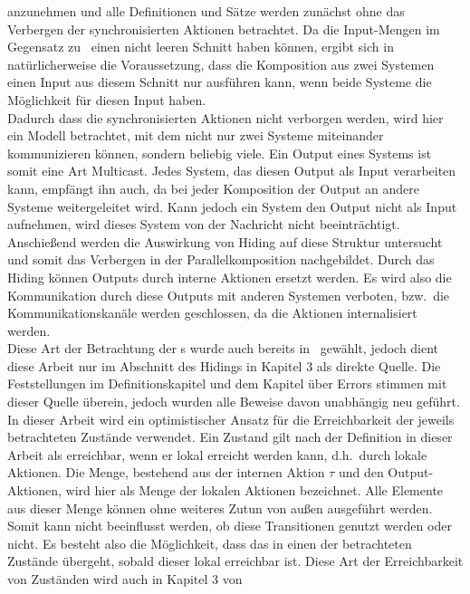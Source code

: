 anzunehmen und alle Definitionen und Sätze werden zunächst ohne das
Verbergen der synchronisierten Aktionen betrachtet. Da die Input-Mengen im
Gegensatz zu~\cite{Vogler2014EIO} einen
nicht leeren Schnitt haben können, ergibt sich in natürlicherweise die
Voraussetzung, dass die Komposition
aus zwei Systemen einen Input aus diesem Schnitt nur ausführen kann, wenn beide
Systeme die Möglichkeit für diesen Input haben.\\
Dadurch dass die synchronisierten Aktionen nicht verborgen werden, wird hier
ein Modell betrachtet, mit dem nicht nur zwei Systeme miteinander kommunizieren können,
sondern beliebig viele. Ein Output eines Systems ist somit eine Art Multicast.
Jedes System, das diesen Output als Input verarbeiten kann, empfängt ihn auch,
da bei jeder Komposition der Output an andere Systeme weitergeleitet wird.
Kann jedoch ein System den Output nicht als Input aufnehmen, wird dieses System von
der Nachricht nicht beeinträchtigt.\\
Anschießend werden die Auswirkung von Hiding auf diese Struktur
untersucht und somit das Verbergen in der Parallelkomposition nachgebildet.
Durch das Hiding können Outputs durch interne Aktionen ersetzt werden. Es wird
also die Kommunikation durch diese Outputs mit anderen Systemen verboten, bzw.\
die Kommunikationskanäle werden geschlossen, da die Aktionen internalisiert
werden.\\
Diese Art der Betrachtung der
\EIO{}s wurde auch bereits in~\cite{Schlosser2012BA} gewählt, jedoch dient
diese Arbeit nur im Abschnitt des Hidings in Kapitel 3 als direkte Quelle. Die Feststellungen im Definitionskapitel und dem Kapitel über
Errors stimmen mit dieser Quelle überein, jedoch wurden alle Beweise davon unabhängig neu
geführt.\\
In dieser Arbeit wird ein optimistischer Ansatz für die Erreichbarkeit
der jeweils betrachteten Zustände verwendet. Ein Zustand gilt nach der Definition in dieser
Arbeit als erreichbar, wenn er lokal erreicht
werden kann, d.h.\ durch lokale Aktionen. Die Menge, bestehend aus der internen
Aktion $\tau$ und den Output-Aktionen, wird hier als Menge der lokalen Aktionen
bezeichnet.
Alle Elemente aus dieser Menge können ohne weiteres Zutun von außen ausgeführt
werden. Somit kann nicht beeinflusst werden, ob diese Transitionen genutzt
werden oder nicht. Es besteht also die Möglichkeit, dass das \EIO{} in einen
der betrachteten Zustände übergeht, sobald dieser lokal erreichbar ist. Diese Art der
Erreichbarkeit von Zuständen wird auch in Kapitel 3 von~\cite{Vogler2014EIO}
